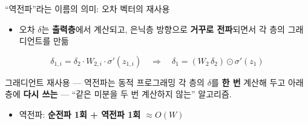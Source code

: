 \begin{frame}{``역전파''라는 이름의 의미: 오차 벡터의 재사용}
  \begin{itemize}
    \item 오차 $\delta$는 \textbf{출력층}에서 계산되고, 은닉층 방향으로
      \textbf{거꾸로 전파}되면서 각 층의 그래디언트를 만듦
  \end{itemize}
  \[
  \delta_{1,i}
  = \delta_2 \cdot W_{2,i} \cdot \sigma'(z_{1,i})
  \quad \Longrightarrow \quad
  \delta_1 = (W_2 \, \delta_2) \odot \sigma'(z_1)
  \]
  \begin{block}{그래디언트 재사용 — 역전파는 동적 프로그래밍}
    각 층의 $\delta$를 \textbf{한 번} 계산해 두고 아래 층에 \textbf{다시 쓰는} —
    ``같은 미분을 두 번 계산하지 않는'' 알고리즘.
  \end{block}
  \begin{itemize}\small
    
    \item 역전파: \textbf{순전파 1회 + 역전파 1회 $\approx O(W)$}
  \end{itemize}

\end{frame}
